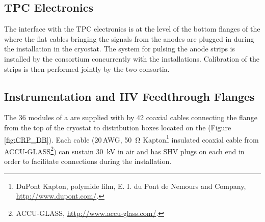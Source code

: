 \subsection{TPC Electronics}
\label{sec:fddp-crp-intfc-elec}

The interface with the \dual TPC electronics is at the level of the bottom flanges of the  where the flat cables bringing the signals from the anodes are plugged in during the  installation in the cryostat. The system for %
pulsing the anode strips is installed by the  consortium %
concurrently with the  installations. %
Calibration of the strips is then performed jointly by the two consortia.

\subsection{Instrumentation and HV Feedthrough Flanges}
\label{sec:fddp-crp-intfc-FT}
The \num{36}  modules of a  are supplied with  by \num{42} coaxial cables 
connecting the \fdth flange from the top of the cryostat to distribution boxes located on the  (Figure \ref{fig:CRP_DB}). Each cable (\num{20}\,AWG, \SI{50}{\ohm} Kapton\footnote{DuPont\texttrademark{} Kapton, polymide film,  E. I. du Pont de Nemours and Company,  \url{http://www.dupont.com/}.} insulated coaxial cable from ACCU-GLASS\footnote{ACCU-GLASS\texttrademark{}, \url{http://www.accu-glass.com/}.}) can sustain \SI{30}{kV} in air and has SHV plugs on each end in order to facilitate connections during the  installation.


